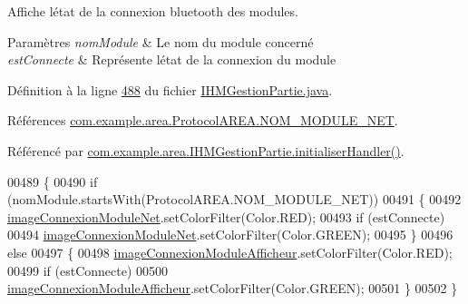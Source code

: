 Affiche l\textquotesingle{}état de la connexion bluetooth des modules. 


\begin{DoxyParams}{Paramètres}
{\em nom\+Module} & Le nom du module concerné \\
\hline
{\em est\+Connecte} & Représente l\textquotesingle{}état de la connexion du module \\
\hline
\end{DoxyParams}


Définition à la ligne \hyperlink{_i_h_m_gestion_partie_8java_source_l00488}{488} du fichier \hyperlink{_i_h_m_gestion_partie_8java_source}{I\+H\+M\+Gestion\+Partie.\+java}.



Références \hyperlink{_protocol_a_r_e_a_8java_source_l00025}{com.\+example.\+area.\+Protocol\+A\+R\+E\+A.\+N\+O\+M\+\_\+\+M\+O\+D\+U\+L\+E\+\_\+\+N\+ET}.



Référencé par \hyperlink{_i_h_m_gestion_partie_8java_source_l00291}{com.\+example.\+area.\+I\+H\+M\+Gestion\+Partie.\+initialiser\+Handler()}.


\begin{DoxyCode}
00489     \{
00490         \textcolor{keywordflow}{if} (nomModule.startsWith(ProtocolAREA.NOM\_MODULE\_NET))
00491         \{
00492             \hyperlink{classcom_1_1example_1_1area_1_1_i_h_m_gestion_partie_a98c578b0056e17278e27aacefa933952}{imageConnexionModuleNet}.setColorFilter(Color.RED);
00493             \textcolor{keywordflow}{if} (estConnecte)
00494                 \hyperlink{classcom_1_1example_1_1area_1_1_i_h_m_gestion_partie_a98c578b0056e17278e27aacefa933952}{imageConnexionModuleNet}.setColorFilter(Color.GREEN);
00495         \}
00496         \textcolor{keywordflow}{else}
00497         \{
00498             \hyperlink{classcom_1_1example_1_1area_1_1_i_h_m_gestion_partie_aae13761712b67eac1e69ac900c265ffc}{imageConnexionModuleAfficheur}.setColorFilter(Color.RED);
00499             \textcolor{keywordflow}{if} (estConnecte)
00500                 \hyperlink{classcom_1_1example_1_1area_1_1_i_h_m_gestion_partie_aae13761712b67eac1e69ac900c265ffc}{imageConnexionModuleAfficheur}.setColorFilter(Color.GREEN);
00501         \}
00502     \}
\end{DoxyCode}
\mbox{\label{classcom_1_1example_1_1area_1_1_i_h_m_gestion_partie_a1892c3b33ec5d93514dfa8e30f61204d}} 
